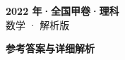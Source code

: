 \documentclass[zihao=-4, a4paper]{ctexart}
\begin{document}
\begin{center}
  {\Large\bfseries 2022 年·全国甲卷·理科}\\[4pt]
  {\large 数学 · 解析版}
\end{center}
\medskip
{}

\clearpage
{}
\begin{center}{\Large\bfseries 参考答案与详细解析}\end{center}
\medskip

\end{document}
